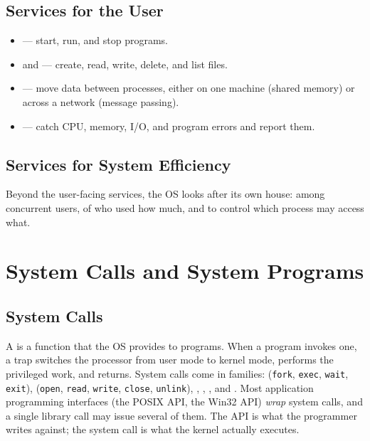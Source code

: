\documentclass[11pt]{article}
\begin{document}
\subsection{Services for the User}

\begin{itemize}
  \item {} --- start, run, and stop programs.
  \item {} and  --- create, read, write, delete, and list files.
  \item {} --- move data between processes, either on one machine (shared memory) or across a network (message passing).
  \item {} --- catch CPU, memory, I/O, and program errors and report them.
\end{itemize}

\subsection{Services for System Efficiency}

Beyond the user-facing services, the OS looks after its own house:  among concurrent users,  of who used how much, and  to control which process may access what.

\section{System Calls and System Programs}

\subsection{System Calls}

A  is a function that the OS provides to programs. When a program invokes one, a trap switches the processor from user mode to kernel mode, performs the privileged work, and returns. System calls come in families:  (\texttt{fork}, \texttt{exec}, \texttt{wait}, \texttt{exit}),  (\texttt{open}, \texttt{read}, \texttt{write}, \texttt{close}, \texttt{unlink}), , , , and . Most application programming interfaces (the POSIX API, the Win32 API) \emph{wrap} system calls, and a single library call may issue several of them. The API is what the programmer writes against; the system call is what the kernel actually executes.
\end{document}
